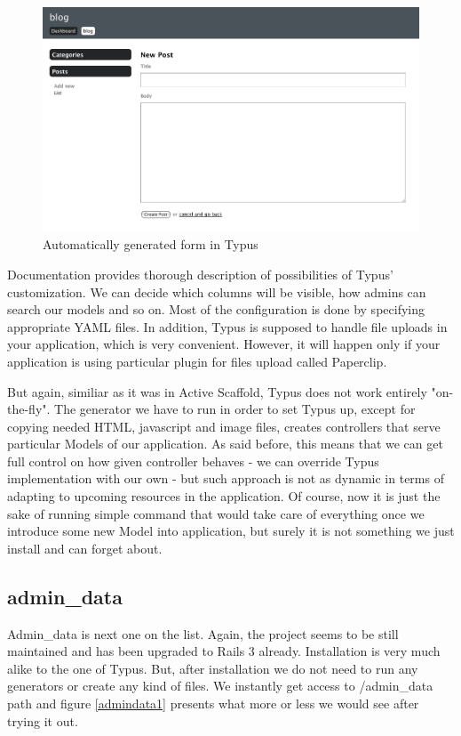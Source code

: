   	\begin{figure}[hbt!]
  		\begin{center}
  			\includegraphics[width=\linewidth]{images/chapter01/typus2.png}
  			\caption{Automatically generated form in Typus}
  			\label{typus2}
  		\end{center}
  	\end{figure}
  
    Documentation provides thorough description of possibilities of Typus' customization. We can decide which columns will be visible, how admins can search our models and so on. Most of the configuration is done by specifying appropriate YAML files. In addition, Typus is supposed to handle file uploads in your application, which is very convenient. However, it will happen only if your application is using particular plugin for files upload called Paperclip.
    
    But again, similiar as it was in Active Scaffold, Typus does not work entirely "on-the-fly". The generator we have to run in order to set Typus up, except for copying needed HTML, javascript and image files, creates controllers that serve particular Models of our application. As said before, this means that we can get full control on how given controller behaves - we can override Typus implementation with our own - but such approach is not as dynamic in terms of adapting to upcoming resources in the application. Of course, now it is just the sake of running simple command that would take care of everything once we introduce some new Model into application, but surely it is not something we just install and can forget about.
    
    \subsection{admin\_data}
    Admin\_data is next one on the list. Again, the project seems to be still maintained and has been upgraded to Rails 3 already. Installation is very much alike to the one of Typus. But, after installation we do not need to run any generators or create any kind of files. We instantly get access to /admin\_data path and figure \ref{admindata1} presents what more or less we would see after trying it out.
     
